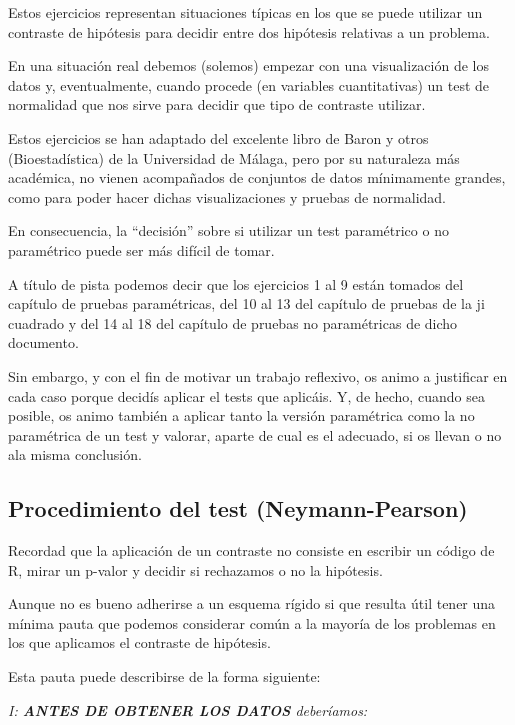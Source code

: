 \documentclass[
]{article}
\begin{document}
Estos ejercicios representan situaciones típicas en los que se puede utilizar un contraste de hipótesis para decidir entre dos hipótesis relativas a un problema.

En una situación real debemos (solemos) empezar con una visualización de los datos y, eventualmente, cuando procede (en variables cuantitativas) un test de normalidad que nos sirve para decidir que tipo de contraste utilizar.

Estos ejercicios se han adaptado del excelente libro de Baron y otros (Bioestadística) de la Universidad de Málaga, pero por su naturaleza más académica, no vienen acompañados de conjuntos de datos mínimamente grandes, como para poder hacer dichas visualizaciones y pruebas de normalidad.

En consecuencia, la ``decisión'' sobre si utilizar un test paramétrico o no paramétrico puede ser más difícil de tomar.

A título de pista podemos decir que los ejercicios 1 al 9 están tomados del capítulo de pruebas paramétricas, del 10 al 13 del capítulo de pruebas de la ji cuadrado y del 14 al 18 del capítulo de pruebas no paramétricas de dicho documento.

Sin embargo, y con el fin de motivar un trabajo reflexivo, os animo a justificar en cada caso porque decidís aplicar el tests que aplicáis. Y, de hecho, cuando sea posible, os animo también a aplicar tanto la versión paramétrica como la no paramétrica de un test y valorar, aparte de cual es el adecuado, si os llevan o no ala misma conclusión.

\subsection{Procedimiento del test (Neymann-Pearson)}\label{procedimiento-del-test-neymann-pearson}

Recordad que la aplicación de un contraste no consiste en escribir un código de R, mirar un p-valor y decidir si rechazamos o no la hipótesis.

Aunque no es bueno adherirse a un esquema rígido si que resulta útil tener una mínima pauta que podemos considerar común a la mayoría de los problemas en los que aplicamos el contraste de hipótesis.

Esta pauta puede describirse de la forma siguiente:

\emph{I: \textbf{ANTES DE OBTENER LOS DATOS} deberíamos:}
\end{document}
